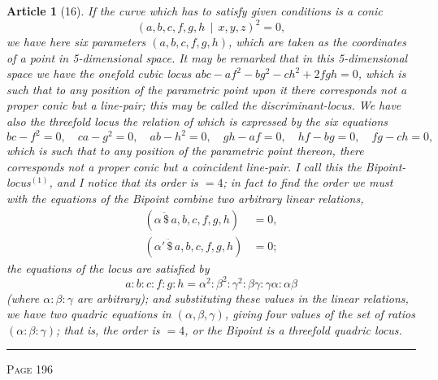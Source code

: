 \documentclass[11pt,a4paper]{article}
\theoremstyle{cayley}
\newtheorem{art}{Article}
\begin{document}
\begin{art}[16]
If the curve which has to satisfy given conditions is a conic
\[
(a, b, c, f, g, h \,\mid\, x, y, z)^2 = 0,
\]
we have here six parameters $(a, b, c, f, g, h)$, which are taken as the coordinates of a point in 5-dimensional space. It may be remarked that in this 5-dimensional space we have the onefold cubic locus $abc - af^2 - bg^2 - ch^2 + 2fgh = 0$, which is such that to any position of the parametric point upon it there corresponds not a proper conic but a line-pair; this may be called the discriminant-locus. We have also the threefold locus the relation of which is expressed by the six equations
\[
bc - f^2 = 0, \quad ca - g^2 = 0, \quad ab - h^2 = 0, \quad gh - af = 0, \quad hf - bg = 0, \quad fg - ch = 0,
\]
which is such that to any position of the parametric point thereon, there corresponds not a proper conic but a coincident line-pair. I call this the Bipoint-locus$^{(1)}$, and I notice that its order is $=4$; in fact to find the order we must with the equations of the Bipoint combine two arbitrary linear relations,
\begin{align*}
(\alpha \,\ddot{\$}\, a, b, c, f, g, h) &= 0, \\
(\alpha' \,\ddot{\$}\, a, b, c, f, g, h) &= 0;
\end{align*}
the equations of the locus are satisfied by
\[
a : b : c : f : g : h = \alpha^2 : \beta^2 : \gamma^2 : \beta\gamma : \gamma\alpha : \alpha\beta
\]
(where $\alpha : \beta : \gamma$ are arbitrary); and substituting these values in the linear relations, we have two quadric equations in $(\alpha, \beta, \gamma)$, giving four values of the set of ratios $(\alpha : \beta : \gamma)$; that is, the order is $= 4$, or the Bipoint is a threefold quadric locus.
\end{art}

\vspace{1em}
\noindent\rule{\textwidth}{0.4pt}
\begin{center}\textsc{Page 196}\end{center}
\newpage
\end{document}
